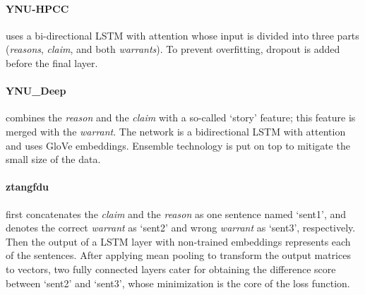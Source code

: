 \paragraph{YNU-HPCC}
uses a bi-directional LSTM with attention whose input is divided into three parts (\emph{reasons}, \emph{claim}, and both \emph{warrants}). To prevent overfitting, dropout is added before the final layer. 


\paragraph{YNU\_Deep}
combines the \emph{reason} and the \emph{claim} with a so-called `story' feature; this feature is merged with the \emph{warrant}. The network is a bidirectional LSTM with attention and uses GloVe embeddings. Ensemble technology is put on top to mitigate the small size of the data.


\paragraph{ztangfdu}
first concatenates the \emph{claim} and the \emph{reason} as one sentence named `sent1', and denotes the correct \emph{warrant} as `sent2' and wrong \emph{warrant} as `sent3', respectively. Then the output of a LSTM layer with non-trained embeddings represents each of the sentences. After applying mean pooling to transform the output matrices to vectors, two fully connected layers cater for obtaining the difference score between `sent2' and `sent3', whose minimization is the core of the loss function.

